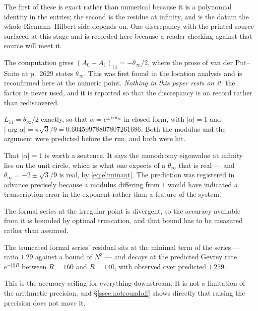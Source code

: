 The first of these is exact rather than numerical because it is a polynomial
identity in the entries; the second is the residue at infinity, and is the
datum the whole Riemann--Hilbert side depends on. One discrepancy with the
printed source surfaced at this stage and is recorded here because a reader
checking against that source will meet it.

\begin{remark}
The computation gives $(A_0+A_1)_{11}=-\theta_\infty/2$, where the prose of van
der Put--Saito at p.~2629 states $\theta_\infty$. This was first found in the
location analysis and is reconfirmed here at the numeric point. \emph{Nothing
in this paper rests on it}: the factor is never used, and it is reported so
that the discrepancy is on record rather than rediscovered.
\end{remark}

\begin{remark}
$L_{11}=\theta_\infty/2$ exactly, so that $\alpha=e^{\pm i\pi\theta_\infty}$ in
closed form, with $|\alpha|=1$ and
$|\arg\alpha|=\pi\sqrt3/9=0.60459978807807261686$. Both the modulus and the
argument were predicted before the run, and both were hit.
\end{remark}

That $|\alpha|=1$ is worth a sentence. It says the monodromy eigenvalue at
infinity lies on the unit circle, which is what one expects of a $\theta_\infty$
that is real --- and $\theta_\infty=-2\pm\sqrt3/9$ is real, by
\eqref{eq:eliminant}. The prediction was registered in advance precisely
because a modulus differing from $1$ would have indicated a transcription error
in the exponent rather than a feature of the system.

The formal series at the irregular point is divergent, so the accuracy
available from it is bounded by optimal truncation, and that bound has to be
measured rather than assumed.

\begin{remark}
The truncated formal series' residual sits at the minimal term of the series
--- ratio $1.29$ against a bound of $N^3$ --- and decays at the predicted
Gevrey rate $e^{-|t|R}$ between $R=160$ and $R=140$, with observed over
predicted $1.259$.
\end{remark}

This is the accuracy ceiling for everything downstream. It is not a limitation
of the arithmetic precision, and \S\ref{ssec:notroundoff} shows directly that
raising the precision does not move it.

